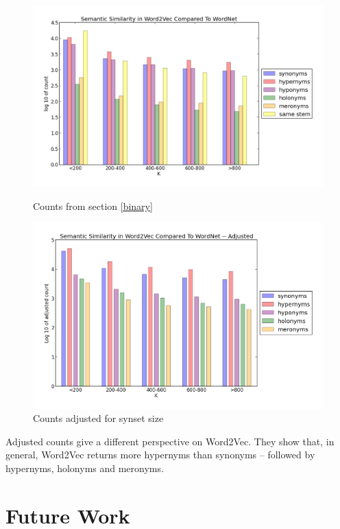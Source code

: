 \documentclass{article}
\begin{document}
\begin{figure}[!ht]
  \begin{minipage}{0.7\textwidth}
    \includegraphics[width=\textwidth]{All.png}
    \caption{Counts from section \ref{binary}}
  \end{minipage}
 
  \begin{minipage}{0.7\textwidth}
    \includegraphics[width=\textwidth]{Adjusted.png}
    \caption{Counts adjusted for synset size}
  \end{minipage}
\end{figure}

Adjusted counts give a different perspective on Word2Vec. They show that, in general, Word2Vec returns more hypernyms than synonyms -- followed by hypernyms, holonyms and meronyms. 

\section{Future Work} \label{Future Work}
\end{document}
